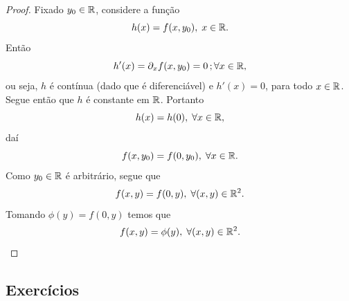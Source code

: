 \begin{proof}
    Fixado \(y_0\in\mathbb{R}\), considere a função \[h(x) = f(x,y_0),\; x\in\mathbb{R}.\] Então \[h'(x) = \partial_xf(x,y_0) = 0\,; \forall x\in\mathbb{R},\] ou seja, \(h\) é contínua (dado que é diferenciável) e \(h'(x) = 0\), para todo \(x\in\mathbb{R}\). Segue então que \(h\) é constante em \(\mathbb{R}\). Portanto \[h(x) = h(0),\;\forall x\in\mathbb{R},\] daí \[f(x,y_0) = f(0,y_0),\;\forall x\in\mathbb{R}.\] Como \(y_0\in\mathbb{R}\) é arbitrário, segue que \[f(x,y) = f(0,y),\; \forall(x,y)\in\mathbb{R}^2.\] Tomando \(\phi(y) = f(0,y)\) temos que \[f(x,y) = \phi(y),\; \forall(x,y)\in\mathbb{R}^2.\]
\end{proof}

\subsection{Exercícios}

